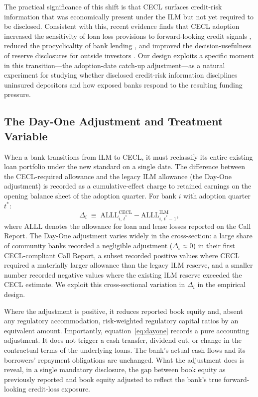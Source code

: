 The practical significance of this shift is that CECL surfaces credit-risk
information that was economically present under the ILM but not yet required to
be disclosed.  Consistent with this, recent evidence finds that CECL adoption
increased the sensitivity of loan loss provisions to forward-looking credit
signals \citep{granja2025current, kim2026current}, reduced the procyclicality
of bank lending \citep{chen2022does}, and improved the decision-usefulness of
reserve disclosures for outside investors \citep{gee2022decision}.  Our design
exploits a specific moment in this transition---the adoption-date catch-up
adjustment---as a natural experiment for studying whether disclosed
credit-risk information disciplines uninsured depositors and how exposed banks
respond to the resulting funding pressure.

\subsection{The Day-One Adjustment and Treatment Variable}
\label{sec:background:dayone}

When a bank transitions from ILM to CECL, it must reclassify its entire existing
loan portfolio under the new standard on a single date.  The difference between
the CECL-required allowance and the legacy ILM allowance (the Day-One
adjustment) is recorded as a cumulative-effect charge to retained earnings on
the opening balance sheet of the adoption quarter.  For bank $i$ with adoption
quarter $t^{*}$:
\begin{equation}
  \Delta_i
  \;\equiv\;
  \mathrm{ALLL}^{\mathrm{CECL}}_{i,\,t^{*}}
  -
  \mathrm{ALLL}^{\mathrm{ILM}}_{i,\,t^{*}-1},
  \label{eq:dayone}
\end{equation}
where $\mathrm{ALLL}$ denotes the allowance for loan and lease losses reported
on the Call Report.  The Day-One adjustment varies widely in the cross-section:
a large share of community banks recorded a negligible adjustment
($\Delta_i \approx 0$) in their first CECL-compliant Call Report, a subset
recorded positive values where CECL required a materially larger allowance than
the legacy ILM reserve, and a smaller number recorded negative values where the
existing ILM reserve exceeded the CECL estimate.  We exploit this
cross-sectional variation in $\Delta_i$ in the empirical design.

Where the adjustment is positive, it reduces reported book equity and, absent
any regulatory accommodation, risk-weighted regulatory capital ratios by an
equivalent amount.
Importantly, equation~\eqref{eq:dayone} records a pure accounting adjustment.
It does not trigger a cash transfer, dividend cut, or change in the contractual
terms of the underlying loans.  The bank's actual cash flows and its
borrowers' repayment obligations are unchanged.  What the adjustment does is
reveal, in a single mandatory disclosure, the gap between book equity as
previously reported and book equity adjusted to reflect the bank's true
forward-looking credit-loss exposure.

